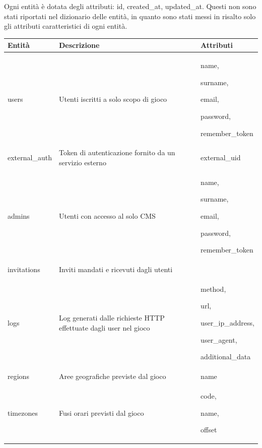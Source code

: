 Ogni entità è dotata degli attributi: id, created\_at, updated\_at. Questi non sono stati riportati nel dizionario delle entità, in quanto sono stati messi in risalto solo gli attributi caratteristici di ogni entità.

\begin{longtabu} to \textwidth {l X[2] X}
	\toprule
	\textbf{Entità} & \textbf{Descrizione} & \textbf{Attributi}\\
	\midrule
	\endhead
	users                            & Utenti iscritti a solo scopo di gioco     & name,\par surname,\par email,\par password,\par remember\_token \\ \midrule
external\_auth                   & Token di autenticazione fornito da un servizio esterno                               & external\_uid                                                                             \\ \midrule
admins                           & Utenti con accesso al solo CMS                                                       & name,\par surname,\par email,\par password,\par remember\_token                                           \\ \midrule
invitations                      & Inviti mandati e ricevuti dagli utenti     &                                                                                           \\ \midrule
logs                             & Log generati dalle richieste HTTP effettuate dagli user nel gioco                    & method,\par url,\par user\_ip\_address,\par user\_agent,\par additional\_data                             \\ \midrule
regions                          & Aree geografiche previste dal gioco                                                  & name                                                                                      \\ \midrule
timezones                        & Fusi orari previsti dal gioco                                                        & code,\par name,\par offset                                                                        \\ \midrule

\end{longtabu}
